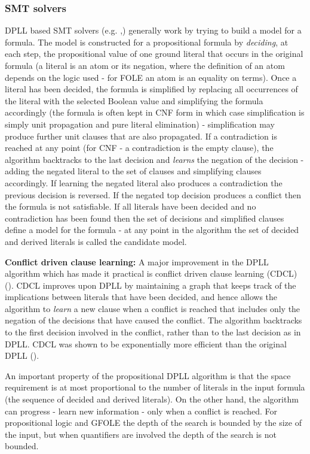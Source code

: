 \subsubsection*{SMT solvers}
DPLL based SMT solvers (e.g. \cite{DBLP:conf/cav/BarrettCDHJKRT11},\cite{DBLP:conf/tacas/MouraB08}) generally work by trying to build a model for a formula. The model is constructed for a propositional formula by \textit{deciding}, at each step, the propositional value of one ground literal that occurs in the original formula (a literal is an atom or its negation, where the definition of an atom depends on the logic used - for FOLE an atom is an equality on terms). Once a literal has been decided, the formula is simplified by replacing all occurrences of the literal with the selected Boolean value and simplifying the formula accordingly (the formula is often kept in CNF form in which case simplification is simply unit propagation and pure literal elimination) - simplification may produce further unit clauses that are also propagated. 
If a contradiction is reached at any point (for CNF - a contradiction is the empty clause), the algorithm backtracks to the last decision and \textit{learns} the negation of the decision - adding the negated literal to the set of clauses and simplifying clauses accordingly. If learning the negated literal also produces a contradiction the previous decision is reversed. If the negated top decision produces a conflict then the formula is not satisfiable.
If all literals have been decided and no contradiction has been found then the set of decisions and simplified clauses define a model for the formula - at any point in the algorithm the set of decided and derived literals is called the candidate model. 

\textbf{Conflict driven clause learning:} A major improvement in the DPLL algorithm which has made it practical is conflict driven clause learning (CDCL) (\cite{GRASP}). CDCL improves upon DPLL by maintaining a graph that keeps track of the implications between literals that have been decided, and hence allows the algorithm to \textit{learn} a new clause when a conflict is reached that includes only the negation of the decisions that have caused the conflict. The algorithm backtracks to the first decision involved in the conflict, rather than to the last decision as in DPLL. CDCL was shown to be exponentially more efficient than the original DPLL (\cite{DBLP:conf/aaai/HertelBPG08}).

An important property of the propositional DPLL algorithm is that the space requirement is at most proportional to the number of literals in the input formula (the sequence of decided and derived literals). On the other hand, the algorithm can progress - learn new information - only when a conflict is reached. For propositional logic and GFOLE the depth of the search is bounded by the size of the input, but when quantifiers are involved the depth of the search is not bounded.

